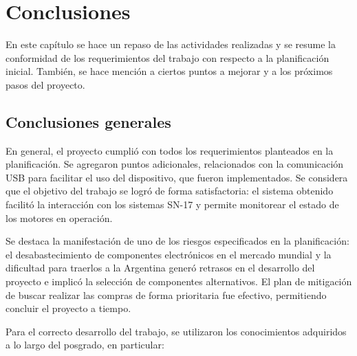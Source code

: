 
\chapter{Conclusiones} %

\label{Chapter5} %




En este capítulo se hace un repaso de las actividades realizadas y se resume la conformidad de los requerimientos del trabajo con respecto a la planificación inicial. También, se hace mención a ciertos puntos a mejorar y a los próximos pasos del proyecto.

\section{Conclusiones generales }

En general, el proyecto cumplió con todos los requerimientos planteados en la planificación. Se agregaron puntos adicionales, relacionados con la comunicación USB para facilitar el uso del dispositivo, que fueron implementados. Se considera que el objetivo del trabajo se logró de forma satisfactoria: el sistema obtenido facilitó la interacción con los sistemas SN-17 y permite monitorear el estado de los motores en operación.

Se destaca la manifestación de uno de los riesgos especificados en la planificación: el desabastecimiento de componentes electrónicos en el mercado mundial y la dificultad para traerlos a la Argentina generó retrasos en el desarrollo del proyecto e implicó la selección de componentes alternativos. El plan de mitigación de buscar realizar las compras de forma prioritaria fue efectivo, permitiendo concluir el proyecto a tiempo.

Para el correcto desarrollo del trabajo, se utilizaron los conocimientos adquiridos a lo largo del posgrado, en particular:

